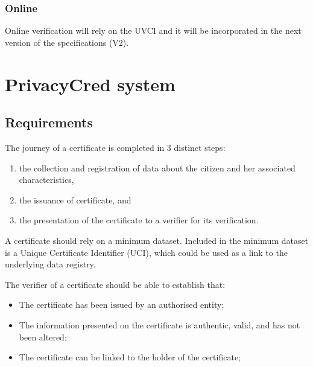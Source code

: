 \documentclass[a4paper,12pt,english]{sphinxhowto}
\begin{document}
\subsubsection{Online}
\label{\detokenize{ssi/annotehealth:online}}
\sphinxAtStartPar
Online verification will rely on the UVCI and it will be incorporated in the next version of the specifications (V2).


\section{PrivacyCred system}
\label{\detokenize{ssi/privacycred:privacycred-system}}\label{\detokenize{ssi/privacycred::doc}}

\subsection{Requirements}
\label{\detokenize{ssi/privacycred:requirements}}
\sphinxAtStartPar
The journey of a certificate is completed in 3 distinct steps:
\begin{enumerate}
%
\item {} 
\sphinxAtStartPar
the collection and registration of data about the citizen and her associated characteristics,

\item {} 
\sphinxAtStartPar
the issuance of certificate, and

\item {} 
\sphinxAtStartPar
the presentation of the certificate to a verifier for its verification.

\end{enumerate}

\sphinxAtStartPar
A certificate should rely on a minimum dataset. Included in the minimum dataset is a Unique Certificate Identifier (UCI), which could be used as a link to the underlying data registry.

\sphinxAtStartPar
The verifier of a certificate should be able to establish that:
\begin{itemize}
\item {} 
\sphinxAtStartPar
The certificate has been issued by an authorised entity;

\item {} 
\sphinxAtStartPar
The information presented on the certificate is authentic, valid, and has not been altered;

\item {} 
\sphinxAtStartPar
The certificate can be linked to the holder of the certificate;

\end{itemize}
\end{document}
